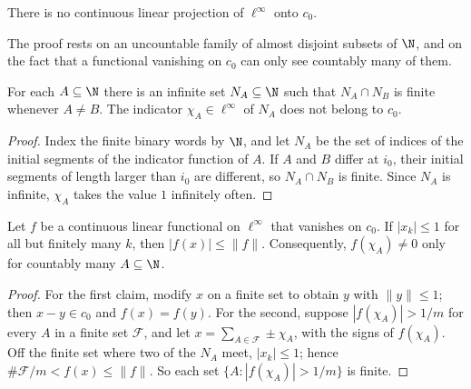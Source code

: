 \begin{theorem}
  \label{thm:ex-phillips}
  \leanok
  There is no continuous linear projection of $\ell^\infty$ onto $c_0$.
\end{theorem}

The proof rests on an uncountable family of almost disjoint subsets of $\N$, and on the fact
that a functional vanishing on $c_0$ can only see countably many of them.

\begin{lemma}
  \label{lem:ex-almost-disjoint}
  \leanok
  For each $A \subseteq \N$ there is an infinite set $N_A \subseteq \N$ such that
  $N_A \cap N_B$ is finite whenever $A \ne B$. The indicator $\chi_A \in \ell^\infty$ of $N_A$
  does not belong to $c_0$.
\end{lemma}

\begin{proof}
  \leanok
  Index the finite binary words by $\N$, and let $N_A$ be the set of indices of the initial
  segments of the indicator function of $A$. If $A$ and $B$ differ at $i_0$, their initial
  segments of length larger than $i_0$ are different, so $N_A \cap N_B$ is finite. Since $N_A$
  is infinite, $\chi_A$ takes the value $1$ infinitely often.
\end{proof}

\begin{lemma}[Whitley]
  \label{lem:ex-whitley}
  \leanok
  Let $f$ be a continuous linear functional on $\ell^\infty$ that vanishes on $c_0$. If
  $|x_k| \le 1$ for all but finitely many $k$, then $|f(x)| \le \|f\|$. Consequently,
  $f(\chi_A) \ne 0$ only for countably many $A \subseteq \N$.
\end{lemma}

\begin{proof}
  \leanok
  For the first claim, modify $x$ on a finite set to obtain $y$ with $\|y\| \le 1$; then
  $x - y \in c_0$ and $f(x) = f(y)$. For the second, suppose $|f(\chi_A)| > 1/m$ for every $A$ in
  a finite set $\mathcal F$, and let $x = \sum_{A \in \mathcal F} \pm\chi_A$, with the signs of
  $f(\chi_A)$. Off the finite set where two of the $N_A$ meet, $|x_k| \le 1$; hence
  $\#\mathcal F/m < f(x) \le \|f\|$. So each set $\{A : |f(\chi_A)| > 1/m\}$ is finite.
\end{proof}

